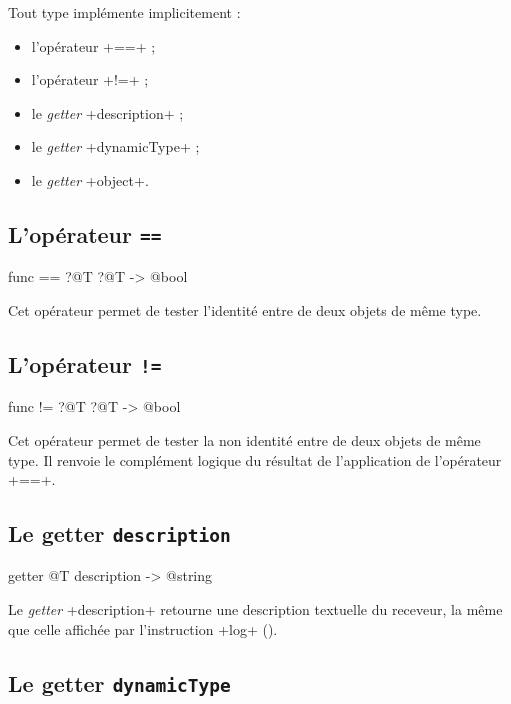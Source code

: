 Tout type implémente implicitement :
\begin{itemize}
  \item l'opérateur \ggst+==+ ;
  \item l'opérateur \ggst+!=+ ;
  \item le \emph{getter} \ggst+description+ ;
  \item le \emph{getter} \ggst+dynamicType+ ;
  \item le \emph{getter} \ggst+object+.
\end{itemize}


\subsection{L'opérateur \texttt{==}}

\begin{galgas3}
func == ?@T ?@T -> @bool
\end{galgas3}

Cet opérateur permet de tester l'identité entre de deux objets de même type.

\subsection{L'opérateur \texttt{!=}}

\begin{galgas3}
func != ?@T ?@T -> @bool
\end{galgas3}

Cet opérateur permet de tester la non identité entre de deux objets de même type. Il renvoie le complément logique du résultat de l'application de l'opérateur \ggst+==+.





\subsection{Le getter \texttt{description}}

\begin{galgas3}
getter @T description -> @string
\end{galgas3}

Le \emph{getter} \ggst+description+ retourne une description textuelle du receveur, la même que celle affichée par l'instruction \ggst+log+ ().



\subsection{Le getter \texttt{dynamicType}}

